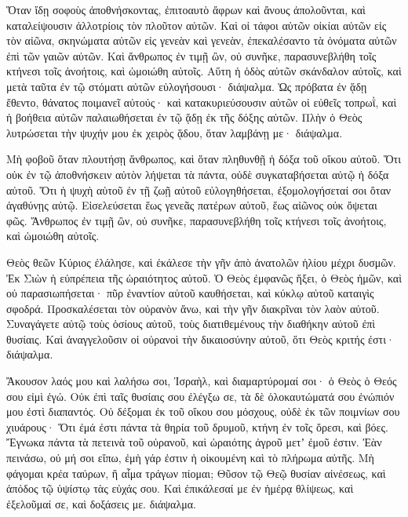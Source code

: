 \begin{spacing}{1.1}
\begin{multicols}{2}
Ὅταν ἴδῃ σοφοὺς ἀποθνήσκοντας, ἐπιτοαυτὸ ἄφρων καὶ ἄνους ἀπολοῦνται, καὶ καταλείψουσιν ἀλλοτρίοις τὸν πλοῦτον αὐτῶν.
Καὶ οἱ τάφοι αὐτῶν οἰκίαι αὐτῶν εἰς τὸν αἰῶνα, σκηνώματα αὐτῶν εἰς γενεὰν καὶ γενεὰν, ἐπεκαλέσαντο τὰ ὀνόματα αὐτῶν ἐπὶ τῶν γαιῶν αὐτῶν.
Καὶ ἄνθρωπος ἐν τιμῇ ὢν, οὐ συνῆκε, παρασυνεβλήθη τοῖς κτήνεσι τοῖς ἀνοήτοις, καὶ ὡμοιώθη αὐτοῖς.
Αὕτη ἡ ὁδὸς αὐτῶν σκάνδαλον αὐτοῖς, καὶ μετὰ ταῦτα ἐν τῷ στόματι αὐτῶν εὐλογήσουσι· διάψαλμα.
Ὡς πρόβατα ἐν ᾅδῃ ἔθεντο, θάνατος ποιμανεῖ αὐτούς· καὶ κατακυριεύσουσιν αὐτῶν οἱ εὐθεῖς τοπρωῒ, καὶ ἡ βοήθεια αὐτῶν παλαιωθήσεται ἐν τῷ ᾅδῃ ἐκ τῆς δόξης αὐτῶν.
Πλὴν ὁ Θεὸς λυτρώσεται τὴν ψυχήν μου ἐκ χειρὸς ᾅδου, ὅταν λαμβάνῃ με· διάψαλμα.

Μὴ φοβοῦ ὅταν πλουτήσῃ ἄνθρωπος, καὶ ὅταν πληθυνθῇ ἡ δόξα τοῦ οἴκου αὐτοῦ.
Ὅτι οὐκ ἐν τῷ ἀποθνήσκειν αὐτὸν λήψεται τὰ πάντα, οὐδὲ συγκαταβήσεται αὐτῷ ἡ δόξα αὐτοῦ.
Ὅτι ἡ ψυχὴ αὐτοῦ ἐν τῇ ζωῇ αὐτοῦ εὐλογηθήσεται, ἐξομολογήσεταί σοι ὅταν ἀγαθύνῃς αὐτῷ.
Εἰσελεύσεται ἕως γενεᾶς πατέρων αὐτοῦ, ἕως αἰῶνος οὐκ ὄψεται φῶς.
Ἄνθρωπος ἐν τιμῇ ὢν, οὐ συνῆκε, παρασυνεβλήθη τοῖς κτήνεσι τοῖς ἀνοήτοις, καὶ ὡμοιώθη αὐτοῖς.

Θεὸς θεῶν Κύριος ἐλάλησε, καὶ ἐκάλεσε τὴν γῆν ἀπὸ ἀνατολῶν ἡλίου μέχρι δυσμῶν.
Ἐκ Σιὼν ἡ εὐπρέπεια τῆς ὡραιότητος αὐτοῦ.
Ὁ Θεὸς ἐμφανῶς ἥξει, ὁ Θεὸς ἡμῶν, καὶ οὐ παρασιωπήσεται· πῦρ ἐναντίον αὐτοῦ καυθήσεται, καὶ κύκλῳ αὐτοῦ καταιγὶς σφοδρά.
Προσκαλέσεται τὸν οὐρανὸν ἄνω, καὶ τὴν γῆν διακρῖναι τὸν λαὸν αὐτοῦ.
Συναγάγετε αὐτῷ τοὺς ὁσίους αὐτοῦ, τοὺς διατιθεμένους τὴν διαθήκην αὐτοῦ ἐπὶ θυσίαις.
Καὶ ἀναγγελοῦσιν οἱ οὐρανοὶ τὴν δικαιοσύνην αὐτοῦ, ὅτι Θεὸς κριτής ἐστι· διάψαλμα.

Ἄκουσον λαός μου καὶ λαλήσω σοι, Ἰσραὴλ, καὶ διαμαρτύρομαί σοι· ὁ Θεὸς ὁ Θεός σου εἰμὶ ἐγώ.
Οὐκ ἐπὶ ταῖς θυσίαις σου ἐλέγξω σε, τὰ δὲ ὁλοκαυτώματά σου ἐνώπιόν μου ἐστὶ διαπαντός.
Οὐ δέξομαι ἐκ τοῦ οἴκου σου μόσχους, οὐδὲ ἐκ τῶν ποιμνίων σου χιυάρους·
Ὅτι ἐμά ἐστι πάντα τὰ θηρία τοῦ δρυμοῦ, κτήνη ἐν τοῖς ὄρεσι, καὶ βόες.
Ἔγνωκα πάντα τὰ πετεινὰ τοῦ οὐρανοῦ, καὶ ὡραιότης ἀγροῦ μετʼ ἐμοῦ ἐστιν.
Ἐὰν πεινάσω, οὐ μή σοι εἴπω, ἐμὴ γάρ ἐστιν ἡ οἰκουμένη καὶ τὸ πλήρωμα αὐτῆς.
Μὴ φάγομαι κρέα ταύρων, ἢ αἷμα τράγων πίομαι;
Θῦσον τῷ Θεῷ θυσίαν αἰνέσεως, καὶ ἀπόδος τῷ ὑψίστῳ τὰς εὐχάς σου.
Καὶ ἐπικάλεσαί με ἐν ἡμέρᾳ θλίψεως, καὶ ἐξελοῦμαί σε, καὶ δοξάσεις με. διάψαλμα.


\end{multicols}
\end{spacing}

